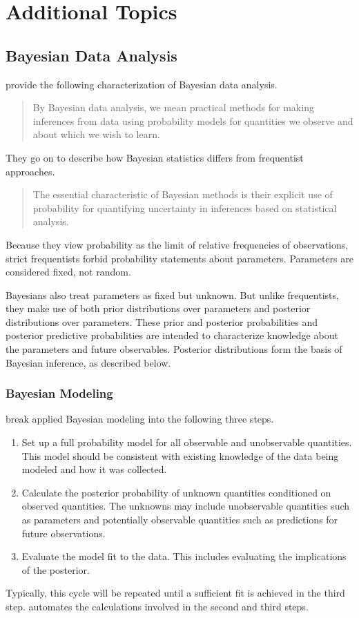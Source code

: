 \part{Additional Topics}


\chapter{Bayesian Data Analysis}\label{bayesian.chapter}

\noindent
\cite{GelmanCarlinSternRubin:2003} provide the following
characterization of Bayesian data analysis.
%
\begin{quote}
  By Bayesian data analysis, we mean practical methods for making
  inferences from data using probability models for quantities we
  observe and about which we wish to learn.
\end{quote}
%
They go on to describe how Bayesian statistics differs from
frequentist approaches.
%
\begin{quote}
  The essential characteristic of Bayesian methods is their explicit
  use of probability for quantifying uncertainty in inferences based
  on statistical analysis.
\end{quote}
%
Because they view probability as the limit of relative frequencies of
observations, strict frequentists forbid probability statements about
parameters.  Parameters are considered fixed, not random.  

Bayesians also treat parameters as fixed but unknown.  But unlike
frequentists, they make use of both prior distributions over
parameters and posterior distributions over parameters.  These prior
and posterior probabilities and posterior predictive probabilities are
intended to characterize knowledge about the parameters and future
observables.  Posterior distributions form the basis of Bayesian
inference, as described below.

\section{Bayesian Modeling}

\citep{GelmanCarlinSternRubin:2003} break applied Bayesian modeling
into the following three steps.
%
\begin{enumerate}
\item  Set up a full probability model for all observable and
  unobservable quantities.  This model should be consistent with
  existing knowledge of the data being modeled and how it was
  collected.
\item Calculate the posterior probability of unknown quantities
  conditioned on observed quantities.  The unknowns may include
  unobservable quantities such as parameters and potentially
  observable quantities such as predictions for future observations.
\item Evaluate the model fit to the data.  This includes evaluating
  the implications of the posterior.
\end{enumerate}
%
Typically, this cycle will be repeated until a sufficient fit is
achieved in the third step.  \Stan automates the calculations involved
in the second and third steps.

